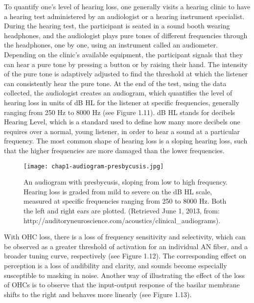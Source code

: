 To quantify one's level of hearing loss, one generally visits a hearing clinic to have a hearing test administered by an audiologist or a hearing instrument specialist.  During the hearing test, the participant is seated in a sound booth wearing headphones, and the audiologist plays pure tones of different frequencies through the headphones, one by one, using an instrument called an audiometer.  Depending on the clinic's available equipment, the participant signals that they can hear a pure tone by pressing a button or by raising their hand.  The intensity of the pure tone is adaptively adjusted to find the threshold at which the listener can consistently hear the pure tone.  At the end of the test, using the data collected, the audiologist creates an audiogram, which quantifies the level of hearing loss in units of dB HL for the listener at specific frequencies, generally ranging from 250 Hz to 8000 Hz (see Figure 1.11).  dB HL stands for decibels Hearing Level, which is a standard used to define how many more decibels one requires over a normal, young listener, in order to hear a sound at a particular frequency.  The most common shape of hearing loss is a sloping hearing loss, such that the higher frequencies are more damaged than the lower frequencies.

\begin{figure}[htbp]
\begin{center}
\texttt{[image: chap1-audiogram-presbycusis.jpg]} \\
\caption[Audiogram with presbycusis]{An audiogram with presbycusis, sloping from low to high frequency.  Hearing loss is graded from mild to severe on the dB HL scale, measured at specific frequencies ranging from 250 to 8000 Hz.  Both the left and right ears are plotted.  (Retrieved June 1, 2013, from: http://auditoryneuroscience.com/acoustics/clinical\_audiograms).}
\label{audiogram-schematic}
\end{center}
\end{figure}

With OHC loss, there is a loss of frequency sensitivity and selectivity, which can be observed as a greater threshold of activation for an individual AN fiber, and a broader tuning curve, respectively (see Figure 1.12).  The corresponding effect on perception is a loss of audibility and clarity, and sounds become especially susceptible to masking in noise.  Another way of illustrating the effect of the loss of OHCs is to observe that the input-output response of the basilar membrane shifts to the right and behaves more linearly (see Figure 1.13).

